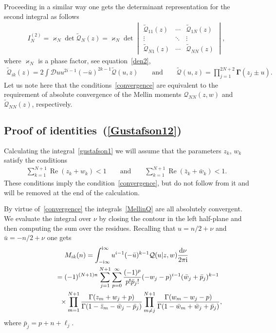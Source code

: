 \documentclass[pdftex]{sigma}
\numberwithin{equation}{section}
\begin{document}
Proceeding in a similar way one gets the determinant representation for the second integral as follows
\begin{gather*}%
I_N^{(2)} =\varkappa_N \det \boldsymbol{\widetilde {\mathcal Q}}_N(z)=\varkappa_N \det \begin{vmatrix}
\widetilde{\mathcal{Q}}_{11}(z)&\cdots& \widetilde{\mathcal{Q}}_{1N}(z)\\
\vdots & \ddots &\vdots\\
\widetilde{\mathcal{Q}}_{N1}(z)&\cdots& \widetilde{\mathcal{Q}}_{NN}(z)
\end{vmatrix},
\end{gather*}
where $\varkappa_N$ is a phase factor, see equation~\eqref{den2},
\begin{gather*}
\widetilde {\mathcal Q}_{ik}(z)=2\int \mathcal{D}u u^{2i-1}(-\bar u)^{2k-1} \widetilde {\mathcal Q}(u,z) \qquad\text{and}
\qquad
\widetilde{ \mathcal Q}(u,z)=\prod_{j=1}^{2N+2} \boldsymbol\Gamma(z_j\pm u).
\end{gather*}
Let us note here that the conditions~\eqref{convergence} are equivalent to the requirement of absolute convergence of the Mellin moments $\mathcal Q_{NN}(z,w)$ and $\widetilde{\mathcal Q}_{NN}(z)$, respectively.

\subsection{Proof of identities~(\ref{Gustafson12})}\label{subsec:proof}

Calculating the integral~\eqref{gustafson1} we will assume that the parameters $z_k$, $w_k$ satisfy the conditions
\begin{gather}\label{zw-cond}
\sum_{k=1}^{N+1} \operatorname{Re}(z_k+w_k)<1 \qquad \text{and} \qquad \sum_{k=1}^{N+1} \operatorname{Re} (\bar z_k+\bar w_k)<1.
\end{gather}
These conditions imply the condition~\eqref{convergence}, but do not follow from it and will be removed at the end of the calculation.

By virtue of~\eqref{convergence} the integrals~\eqref{MellinQ} are all absolutely convergent. We evaluate the integral
over $\nu$ by closing the contour in the left half-plane and then computing the sum over the residues. Recalling that
$u=n/2+\nu$ and $\bar u=-n/2+\nu$ one gets
\begin{gather*}
M_{ik}(n) =\int^{{\rm i}\infty}_{-{\rm i}\infty} u^{i-1}(-\bar u)^{k-1} \mathcal Q(u|z,w) \frac{{\rm d}\nu}{2\pi {\rm i}}\notag\\
\hphantom{M_{ik}(n)}{} =
(-1)^{(N+1)n}\sum_{j=1}^{N+1} \sum_{p=0}^{\infty}\frac{(-1)^p}{p! \bar p_j!} (-w_{j}-p)^{i-1} (\bar w_{j} + \bar p_j)^{k-1}\notag\\
\hphantom{M_{ik}(n)=}{} \times
\prod_{m=1}^{N+1} \frac{\Gamma(z_m+w_{j}+p)}{\Gamma(1-\bar z_m-\bar w_{j}-\bar p_j)}
\prod_{m \neq j}^{N+1} \frac{\Gamma(w_m-w_{j}-p)}{\Gamma(1-\bar w_m+ \bar w_{j}+ \bar p_j)},%
\end{gather*}
where $\bar p_j = p+n+\ell_j$.
\end{document}
